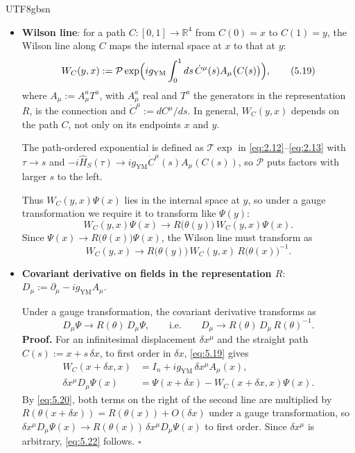 \documentclass[11pt,a4paper,oneside]{report}
\begin{document}
\begin{CJK*}{UTF8}{gbsn}
\begin{itemize}
\item \textbf{\boldmath Wilson line}: for a path $C:[0,1]\to\mathbb R^4$ from $C(0)=x$ to $C(1)=y$, the Wilson line along $C$ maps the internal space at $x$ to that at $y$:
\begin{equation*}
W_C(y,x):=\mathcal P\exp\Bigl(ig_{\mathrm{YM}}\int_0^1ds\,\dot C^\mu(s)A_\mu\bigl(C(s)\bigr)\Bigr),
\tag{5.19}\label{eq:5.19}
\end{equation*}
where $A_\mu:=A_\mu^aT^a$, with $A_\mu^a$ real and $T^a$ the generators in the representation $R$, is the connection and $\dot C^\mu:=dC^\mu/ds$. In general, $W_C(y,x)$ depends on the path $C$, not only on its endpoints $x$ and $y$.

The path-ordered exponential is defined as $\mathcal T\exp$ in \eqref{eq:2.12}–\eqref{eq:2.13} with $\tau\to s$ and $-i\hat H_S(\tau)\to ig_{\mathrm{YM}}\dot C^\mu(s)A_\mu(C(s))$, so $\mathcal P$ puts factors with larger $s$ to the left.

Thus $W_C(y,x)\Psi(x)$ lies in the internal space at $y$, so under a gauge transformation we require it to transform like $\Psi(y)$:
\begin{equation*}
W_C(y,x)\Psi(x)\to R\bigl(\theta(y)\bigr)\,W_C(y,x)\Psi(x).
\tag{5.20}\label{eq:5.20}
\end{equation*}
Since $\Psi(x)\to R\bigl(\theta(x)\bigr)\Psi(x)$, the Wilson line must transform as
\begin{equation*}
W_C(y,x)\to R\bigl(\theta(y)\bigr)\,W_C(y,x)\,R\bigl(\theta(x)\bigr)^{-1}.
\tag{5.21}\label{eq:5.21}
\end{equation*}

\item \textbf{\boldmath Covariant derivative on fields in the representation $R$}: $D_\mu:=\partial_\mu-ig_{\mathrm{YM}}A_\mu$.

Under a gauge transformation, the covariant derivative transforms as
\begin{equation*}
D_\mu\Psi\to R(\theta)\,D_\mu\Psi,\qquad\text{i.e.}\qquad D_\mu\to R(\theta)\,D_\mu\,R(\theta)^{-1}.
\tag{5.22}\label{eq:5.22}
\end{equation*}
\textbf{\boldmath Proof.} For an infinitesimal displacement $\delta x^\mu$ and the straight path $C(s):=x+s\,\delta x$, to first order in $\delta x$, \eqref{eq:5.19} gives
\begin{equation*}
\begin{aligned}
W_C(x+\delta x,x)&=I_n+ig_{\mathrm{YM}}\,\delta x^\mu A_\mu(x),\\
\delta x^\mu D_\mu\Psi(x)&=\Psi(x+\delta x)-W_C(x+\delta x,x)\Psi(x).
\end{aligned}
\tag{5.23}\label{eq:5.23}
\end{equation*}
By \eqref{eq:5.20}, both terms on the right of the second line are multiplied by $R(\theta(x+\delta x))=R(\theta(x))+O(\delta x)$ under a gauge transformation, so $\delta x^\mu D_\mu\Psi(x)\to R(\theta(x))\,\delta x^\mu D_\mu\Psi(x)$ to first order.
Since $\delta x^\mu$ is arbitrary, \eqref{eq:5.22} follows. $\square$


\end{itemize}
\end{CJK*}
\end{document}
